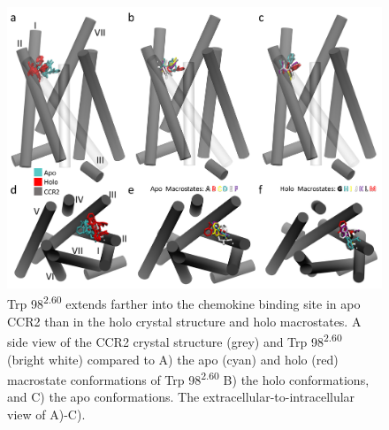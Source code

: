 \begin{figure}[htbp]
\begin{center}
\includegraphics[width=\textwidth]{./figures/trp98_allcentroidsSI.png}
\caption[Trp 98\textsuperscript{2.60} extends farther into the chemokine binding site in apo CCR2 than in the holo crystal structure and holo macrostates]{Trp 98\textsuperscript{2.60} extends farther into the chemokine binding site in apo CCR2 than in the holo crystal structure and holo macrostates. A side view of the CCR2 crystal structure (grey) and Trp 98\textsuperscript{2.60} (bright white) compared to A) the apo (cyan) and holo (red) macrostate conformations of Trp 98\textsuperscript{2.60}  B) the holo conformations, and C) the apo conformations. The extracellular-to-intracellular view of A)-C).}
\label{fig:trp98_allcentroidsSI}
\end{center}
\end{figure}


